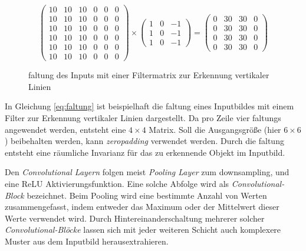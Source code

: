 \begin{equation}
    \label{eq:faltung}
    \begin{pmatrix}
        10 & 10 & 10 & 0 & 0 & 0\\
        10 & 10 & 10 & 0 & 0 & 0\\
        10 & 10 & 10 & 0 & 0 & 0\\
        10 & 10 & 10 & 0 & 0 & 0\\
        10 & 10 & 10 & 0 & 0 & 0\\
        10 & 10 & 10 & 0 & 0 & 0
    \end{pmatrix}
    \times
    \begin{pmatrix}
        1 & 0 & -1\\
        1 & 0 & -1\\
        1 & 0 & -1
    \end{pmatrix}
    = 
    \begin{pmatrix}
        0 & 30 & 30 & 0\\
        0 & 30 & 30 & 0\\
        0 & 30 & 30 & 0\\
        0 & 30 & 30 & 0
    \end{pmatrix}
\end{equation}
\vspace{0.5cm}
\begin{figure}[H]
    \centering
    \def\svgwidth{0.6\textwidth}
    
    \caption{\Gls{faltung} des Inputs mit einer
    Filtermatrix zur Erkennung vertikaler Linien}
    \label{fig:faltung3}
\end{figure}

In Gleichung \ref{eq:faltung} ist beispielhaft die \Gls{faltung} 
eines Inputbildes mit einem Filter zur Erkennung 
vertikaler Linien dargestellt. Da pro Zeile 
vier \Glspl{faltung} angewendet werden, entsteht 
eine $4\times4$ Matrix. Soll die Ausgangsgröße 
(hier $6\times6$) beibehalten werden, kann
\textit{\Gls{zeropadding}} verwendet werden.
Durch die \Gls{faltung} entsteht eine räumliche 
Invarianz für das zu erkennende Objekt im 
Inputbild.

Den \textit{Convolutional Layern} folgen meist
\textit{Pooling Layer} zum \Gls{downsampling},
und eine ReLU Aktivierungsfunktion. Eine solche 
Abfolge wird als \textit{Convolutional-Block}
bezeichnet.
Beim Pooling wird eine bestimmte Anzahl von Werten 
zusammengefasst, indem entweder das Maximum oder der 
Mittelwert dieser Werte verwendet wird.
Durch Hintereinanderschaltung mehrerer solcher
\textit{Convolutional-Blöcke} lassen sich
mit jeder weiteren Schicht auch komplexere 
Muster aus dem Inputbild herausextrahieren.

